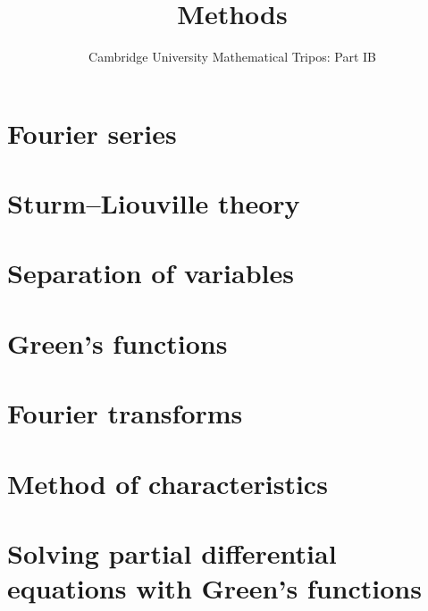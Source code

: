 \documentclass{article}
\title{Methods}
\author{Cambridge University Mathematical Tripos: Part IB}
\begin{document}
\maketitle

\tableofcontentsnewpage{}

\section{Fourier series}

\section{Sturm--Liouville theory}

\section{Separation of variables}

\section{Green's functions}

\section{Fourier transforms}

\section{Method of characteristics}

\section{Solving partial differential equations with Green's functions}

\end{document}
